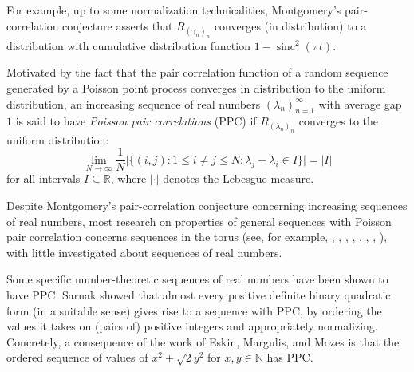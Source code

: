 \documentclass[12pt]{amsart}
\theoremstyle{definition}
\newcommand{\vs}{\vspace{3mm}}
\newcommand{\R}{\mathbb{R}}
\newcommand{\N}{\mathbb{N}}
\newcommand{\T}{\mathbb{T}}
\newcommand{\lam}{\lambda}
\newcommand{\red}{\textcolor{red}}
\DeclareMathOperator{\sinc}{sinc}
\begin{document}
For example, up to some normalization technicalities, Montgomery's pair-correlation conjecture asserts that $R_{(\gamma_n)_n}$ converges (in distribution) to a distribution with cumulative distribution function $1-\sinc^2(\pi t)$.   

\vs

Motivated by the fact that the pair correlation function of a random sequence generated by a Poisson point process converges in distribution to the uniform distribution, an increasing sequence of real numbers $(\lam_n)_{n=1}^\infty$ with average gap $1$ is said to have \textit{Poisson pair correlations} (PPC) if $R_{(\lam_n)_n}$ converges to the uniform distribution: \begin{equation}\label{ppcdefn}\lim_{N \to \infty} \frac{1}{N}\Big|\Big\{(i,j) : 1 \le i \not = j \le N : \lambda_j-\lambda_i \in I\Big\}\Big| = |I|\end{equation} for all intervals $I \subseteq \R$, where $|\cdot|$ denotes the Lebesgue measure. 

\vs

Despite Montgomery's pair-correlation conjecture concerning increasing sequences of real numbers, most research on properties of general sequences with Poisson pair correlation concerns sequences in the torus (see, for example, \cite{all}, \cite{alp}, \cite{heath-brown}, \cite{rudnicksarnak}, \cite{rz1999}, \cite{rz2002}, \cite{steinerberger}, \cite{walker}), with little investigated about sequences of real numbers.




\vs

Some specific number-theoretic sequences of real numbers have been shown to have PPC. Sarnak \cite{sarnak} showed that almost every positive definite binary quadratic form (in a suitable sense) gives rise to a sequence with PPC, by ordering the values it takes on (pairs of) positive integers and appropriately normalizing. Concretely, a consequence of the work of Eskin, Margulis, and Mozes \cite{emm} is that the ordered sequence of values of $x^2+\sqrt{2}y^2$ for $x,y \in \N$ has PPC. 
\end{document}
